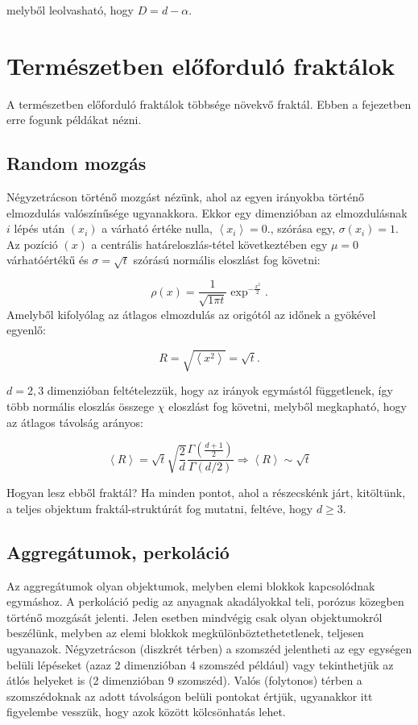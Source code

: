 \documentclass[12pt]{article}
\theoremstyle{plain}
\begin{document}
melyből leolvasható, hogy $D = d- \alpha$. 

\section{Természetben előforduló fraktálok}
A természetben előforduló fraktálok többsége növekvő fraktál. Ebben a fejezetben erre fogunk példákat nézni.


\subsection{Random mozgás}
Négyzetrácson történő mozgást nézünk, ahol az egyen irányokba történő elmozdulás valószínűsége ugyanakkora. Ekkor egy dimenzióban az elmozdulásnak $i$ lépés után $(x_i)$ a várható értéke nulla, $\left< x_i\right>  = 0$., szórása egy, $\sigma\left( x_i\right) = 1$. Az pozíció $\left( x \right)$ a centrális határeloszlás-tétel következtében egy $\mu = 0$ várhatóértékű és $\sigma = \sqrt{t} $ szórású normális eloszlást fog követni:

\begin{equation}
\rho \left( x\right) = 	\frac{1}{\sqrt{1\pi t}} \exp^{-\frac{x^2}{2}}.
\end{equation}
Amelyből kifolyólag az átlagos elmozdulás az origótól az időnek a gyökével egyenlő:

\begin{equation}
R = \sqrt{\left< x^2\right>} = \sqrt{t}.
\end{equation}

$d= 2,3$ dimenzióban feltételezzük, hogy az irányok egymástól függetlenek, így több normális eloszlás összege $\chi$ eloszlást fog követni, melyből megkapható, hogy az átlagos távolság arányos:

\begin{equation}
\left< R \right> = \sqrt{t} \sqrt{\frac{2}{d}} \frac{\Gamma \left( \frac{d+1}{2}\right)}{\Gamma \left( d/2 \right)} \Longrightarrow \left< R \right> \sim \sqrt{t}
\end{equation}

Hogyan lesz ebből fraktál? Ha minden pontot, ahol a részecskénk járt, kitöltünk, a teljes objektum fraktál-struktúrát fog mutatni, feltéve, hogy $ d \geqslant 3 $.



\subsection{Aggregátumok, perkoláció}
Az aggregátumok olyan objektumok, melyben elemi blokkok kapcsolódnak egymáshoz. A perkoláció pedig az anyagnak akadályokkal teli, porózus közegben történő mozgását jelenti. Jelen esetben mindvégig csak olyan objektumokról beszélünk, melyben az elemi blokkok megkülönböztethetetlenek, teljesen ugyanazok. Négyzetrácson (diszkrét térben) a szomszéd jelentheti az egy egységen belüli lépéseket (azaz 2 dimenzióban 4 szomszéd például) vagy tekinthetjük az átlós helyeket is (2 dimenzióban 9 szomszéd). Valós (folytonos) térben a szomszédoknak az adott távolságon belüli pontokat értjük, ugyanakkor itt figyelembe vesszük, hogy azok között kölcsönhatás lehet. \\
\end{document}
